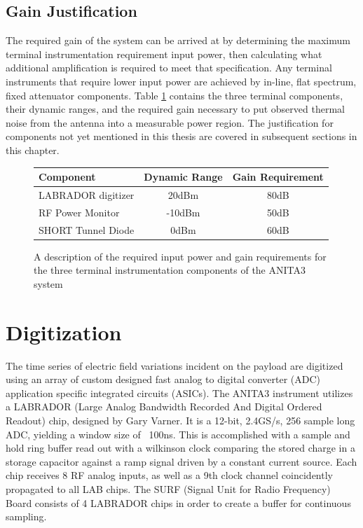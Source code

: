 		
	\subsection{Gain Justification}
		The required gain of the system can be arrived at by determining the maximum terminal instrumentation requirement input power, then calculating what additional amplification is required to meet that specification.  Any terminal instruments that require lower input power are achieved by in-line, flat spectrum, fixed attenuator components.  Table \ref{tab:rfLinkBudget} contains the three terminal components, their dynamic ranges, and the required gain necessary to put observed thermal noise from the antenna into a measurable power region.  The justification for components not yet mentioned in this thesis are covered in subsequent sections in this chapter.
	
\begin{figure}
	\centering
	\begin{tabular}{| l | c | c |}
		\hline
		Component & Dynamic Range & Gain Requirement\\
		\hline
		LABRADOR digitizer & 20dBm & 80dB \\
		RF Power Monitor & -10dBm & 50dB \\
		SHORT Tunnel Diode & 0dBm & 60dB \\
		\hline
	\end{tabular}
	\caption{A description of the required input power and gain requirements for the three terminal instrumentation components of the ANITA3 system}
	\label{tab:rfLinkBudget}
\end{figure}
	
	
\section{Digitization}
	The time series of electric field variations incident on the payload are digitized using an array of custom designed fast analog to digital converter (ADC) application specific integrated circuits (ASICs).  The ANITA3 instrument utilizes a LABRADOR (Large Analog Bandwidth Recorded And Digital Ordered Readout) chip, designed by Gary Varner.\cite{LABASICPAPER}  It is a 12-bit, 2.4GS/s, 256 sample long ADC, yielding a window size of ~100ns.  This is accomplished with a sample and hold ring buffer read out with a wilkinson clock comparing the stored charge in a storage capacitor against a ramp signal driven by a constant current source.  Each chip receives 8 RF analog inputs, as well as a 9th clock channel coincidently propagated to all LAB chips.  The SURF (Signal Unit for Radio Frequency) Board consists of 4 LABRADOR chips in order to create a buffer for continuous sampling.  


